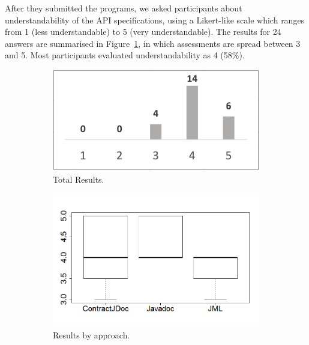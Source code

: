 After they submitted the programs, we asked participants about understandability of the API specifications, using a Likert-like scale which ranges from 1 (less understandable) to 5 (very understandable). The results for 24 answers are summarised in Figure~\ref{fig:ExpAnswersTotal}, in which assessments are spread between 3 and 5. Most participants evaluated understandability as 4 (58\%).

\begin{figure}
\centering
\begin{subfigure}{.32\textwidth}
\includegraphics[width=1\textwidth]{figs/ExpAnswersTotal.png}
\caption{Total Results.}
\label{fig:ExpAnswersTotal}
\end{subfigure}
\begin{subfigure}{.33\textwidth}
\includegraphics[width=1\linewidth]{figs/boxplotApproachesEmpiricalStudy}
\caption{Results by approach.}
\label{fig:approachesEmpirical}
\end{subfigure}
\begin{subfigure}{.33\textwidth}

\end{subfigure}
\end{figure}
